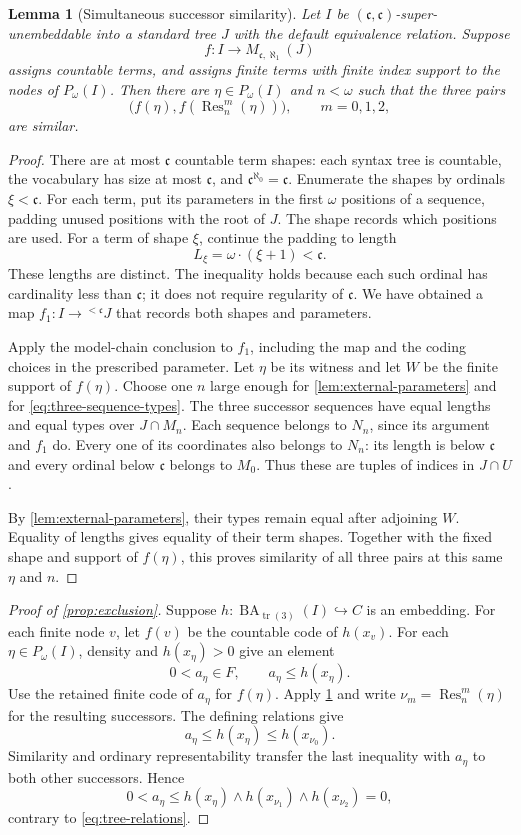 \documentclass[11pt]{article}
\newtheorem{lemma}[theorem]{Lemma}
\theoremstyle{definition}
\theoremstyle{remark}
\newcommand{\Res}{\operatorname{Res}}
\newcommand{\BA}{\operatorname{BA}_{\operatorname{tr}(3)}}
\newcommand{\cc}{\mathfrak c}
\begin{document}
\begin{lemma}[Simultaneous successor similarity]\label{lem:three-successors}
Let $I$ be $(\cc,\cc)$-super-unembeddable into a standard tree $J$
with the default equivalence relation.  Suppose
\[
 f:I\longrightarrow M_{\cc,\aleph_1}(J)
\]
assigns countable terms, and assigns finite terms with finite index support
to the nodes of $P_\omega(I)$.  Then there are $\eta\in P_\omega(I)$
and $n<\omega$ such that the three pairs
\[
 \bigl(f(\eta),f(\Res_n^m(\eta))\bigr),\qquad m=0,1,2,
\]
are similar.
\end{lemma}

\begin{proof}
There are at most $\cc$ countable term shapes: each syntax tree is
countable, the vocabulary has size at most $\cc$, and
$\cc^{\aleph_0}=\cc$.  Enumerate the shapes by ordinals $\xi<\cc$.
For each term, put its parameters in the first $\omega$ positions of a
sequence, padding unused positions with the root of $J$.  The shape
records which positions are used.  For a term of shape $\xi$, continue
the padding to length
\[
 L_\xi=\omega\cdot(\xi+1)<\cc.
\]
These lengths are distinct.  The inequality holds because each such
ordinal has cardinality less than $\cc$; it does not require regularity
of $\cc$.  We have obtained a map
$f_1:I\to{}^{<\cc}J$ that records both shapes and parameters.

Apply the model-chain conclusion to $f_1$, including the map and the
coding choices in the prescribed parameter.  Let $\eta$ be its witness
and let $W$ be the finite support of $f(\eta)$.  Choose one $n$ large
enough for \cref{lem:external-parameters} and for
\eqref{eq:three-sequence-types}.  The three successor sequences have
equal lengths and equal types over $J\cap M_n$.
Each sequence belongs to $N_n$, since its argument and $f_1$ do.
Every one of its coordinates also belongs to $N_n$: its length is below
$\cc$ and every ordinal below $\cc$ belongs to $M_0$.
Thus these are tuples of indices in $J\cap U$.

By \cref{lem:external-parameters}, their types remain equal after
adjoining $W$.  Equality of lengths gives equality of their term shapes.
Together with the fixed shape and support of $f(\eta)$, this proves
similarity of all three pairs at this same $\eta$ and $n$.
\end{proof}

\begin{proof}[Proof of \cref{prop:exclusion}]
Suppose $h:\BA(I)\hookrightarrow C$ is an embedding.  For each finite
node $v$, let $f(v)$ be the countable code of $h(x_v)$.  For each
$\eta\in P_\omega(I)$, density and $h(x_\eta)>0$ give an element
\[
 0<a_\eta\in F,\qquad a_\eta\leq h(x_\eta).
\]
Use the retained finite code of $a_\eta$ for $f(\eta)$.
Apply \cref{lem:three-successors} and write
$\nu_m=\Res_n^m(\eta)$ for the resulting successors.
The defining relations give
\[
 a_\eta\leq h(x_\eta)\leq h(x_{\nu_0}).
\]
Similarity and ordinary representability transfer the last inequality
with $a_\eta$ to both other successors.  Hence
\[
 0<a_\eta
 \leq h(x_\eta)\wedge h(x_{\nu_1})\wedge h(x_{\nu_2})=0,
\]
contrary to \eqref{eq:tree-relations}.
\end{proof}
\end{document}
